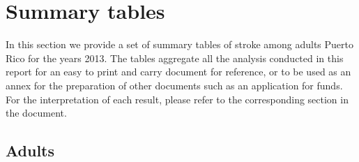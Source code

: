 \newpage
\section{Summary tables}
In this section we provide a set of summary tables of stroke among adults Puerto Rico for the years 2013. The tables aggregate all the analysis conducted in this report for an easy to print and carry document for reference, or to be used as an annex for the preparation of other documents such as an application for funds. For the interpretation of each result, please refer to the corresponding section in the document.

\subsection{Adults}

